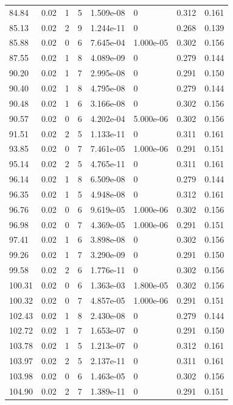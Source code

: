 \documentclass[preview]{standalone}
\begin{document}
{{{{\begin{tabular}{L{1.2cm}C{1.2cm} C{0.3cm}C{0.5cm} C{1.4cm}C{1.4cm} C{1.4cm}C{1.4cm}}
  84.84  &  0.02  & 1     &  5 &  1.509e-08  & 0  & 0.312 &  0.161   \\ 
  85.13  &  0.02  & 2     &  9 &  1.244e-11  & 0  & 0.268 &  0.139   \\ 
  85.88  &  0.02  & 0     &  6 &  7.645e-04  & 1.000e-05  & 0.302 &  0.156   \\ 
  87.55  &  0.02  & 1     &  8 &  4.089e-09  & 0  & 0.279 &  0.144   \\ 
  90.20  &  0.02  & 1     &  7 &  2.995e-08  & 0  & 0.291 &  0.150   \\ 
  90.40  &  0.02  & 1     &  8 &  4.795e-08  & 0  & 0.279 &  0.144   \\ 
  90.48  &  0.02  & 1     &  6 &  3.166e-08  & 0  & 0.302 &  0.156   \\ 
  90.57  &  0.02  & 0     &  6 &  4.202e-04  & 5.000e-06  & 0.302 &  0.156   \\ 
  91.51  &  0.02  & 2     &  5 &  1.133e-11  & 0  & 0.311 &  0.161   \\ 
  93.85  &  0.02  & 0     &  7 &  7.461e-05  & 1.000e-06  & 0.291 &  0.151   \\ 
  95.14  &  0.02  & 2     &  5 &  4.765e-11  & 0  & 0.311 &  0.161   \\ 
  96.14  &  0.02  & 1     &  8 &  6.509e-08  & 0  & 0.279 &  0.144   \\ 
  96.35  &  0.02  & 1     &  5 &  4.948e-08  & 0  & 0.312 &  0.161   \\ 
  96.76  &  0.02  & 0     &  6 &  9.619e-05  & 1.000e-06  & 0.302 &  0.156   \\ 
  96.98  &  0.02  & 0     &  7 &  4.369e-05  & 1.000e-06  & 0.291 &  0.151   \\ 
  97.41  &  0.02  & 1     &  6 &  3.898e-08  & 0  & 0.302 &  0.156   \\ 
  99.26  &  0.02  & 1     &  7 &  3.290e-09  & 0  & 0.291 &  0.150   \\ 
  99.58  &  0.02  & 2     &  6 &  1.776e-11  & 0  & 0.302 &  0.156   \\ 
  100.31  &  0.02  & 0     &  6 &  1.363e-03  & 1.800e-05  & 0.302 &  0.156   \\ 
  100.32  &  0.02  & 0     &  7 &  4.857e-05  & 1.000e-06  & 0.291 &  0.151   \\ 
  102.43  &  0.02  & 1     &  8 &  2.430e-08  & 0  & 0.279 &  0.144   \\ 
  102.72  &  0.02  & 1     &  7 &  1.653e-07  & 0  & 0.291 &  0.150   \\ 
  103.78  &  0.02  & 1     &  5 &  1.213e-07  & 0  & 0.312 &  0.161   \\ 
  103.97  &  0.02  & 2     &  5 &  2.137e-11  & 0  & 0.311 &  0.161   \\ 
  103.98  &  0.02  & 0     &  6 &  1.463e-05  & 0  & 0.302 &  0.156   \\ 
  104.90  &  0.02  & 2     &  7 &  1.389e-11  & 0  & 0.291 &  0.151   \\ 
\hline 
\end{tabular} 

}}}}
\end{document}
